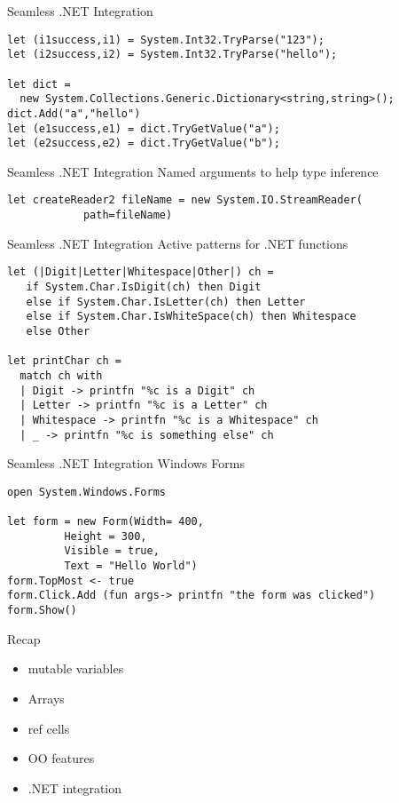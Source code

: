 \documentclass{beamer}
\begin{document}
\begin{frame}[fragile]{Seamless .NET Integration}
  \small
  \begin{verbatim}
let (i1success,i1) = System.Int32.TryParse("123");
let (i2success,i2) = System.Int32.TryParse("hello");

let dict =
  new System.Collections.Generic.Dictionary<string,string>();
dict.Add("a","hello")
let (e1success,e1) = dict.TryGetValue("a");
let (e2success,e2) = dict.TryGetValue("b");
  \end{verbatim}
\end{frame}

\begin{frame}[fragile]{Seamless .NET Integration}
  Named arguments to help type inference
  \begin{verbatim}
let createReader2 fileName = new System.IO.StreamReader(
            path=fileName)
  \end{verbatim}
\end{frame}

\begin{frame}[fragile]{Seamless .NET Integration}
  Active patterns for .NET functions
  \begin{verbatim}
let (|Digit|Letter|Whitespace|Other|) ch = 
   if System.Char.IsDigit(ch) then Digit
   else if System.Char.IsLetter(ch) then Letter
   else if System.Char.IsWhiteSpace(ch) then Whitespace
   else Other

let printChar ch = 
  match ch with
  | Digit -> printfn "%c is a Digit" ch
  | Letter -> printfn "%c is a Letter" ch
  | Whitespace -> printfn "%c is a Whitespace" ch
  | _ -> printfn "%c is something else" ch
  \end{verbatim}
\end{frame}

\begin{frame}[fragile]{Seamless .NET Integration}
  Windows Forms
  \begin{verbatim}
open System.Windows.Forms 

let form = new Form(Width= 400,
         Height = 300,
         Visible = true,
         Text = "Hello World") 
form.TopMost <- true
form.Click.Add (fun args-> printfn "the form was clicked")
form.Show()
  \end{verbatim}
\end{frame}

\begin{frame}{Recap}
  \begin{itemize}[<+->]
    \item mutable variables
    \item Arrays
    \item ref cells
    \item OO features
    \item .NET integration
  \end{itemize}
\end{frame}
\end{document}
